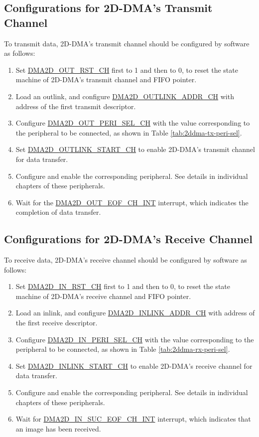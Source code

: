 \documentclass[main\_\_EN.tex]{subfiles}
\begin{document}
\subsection{Configurations for 2D-DMA's Transmit Channel}

To transmit data, 2D-DMA's transmit channel should be configured by software as follows:
\begin{enumerate}
    \item Set \hyperref[fielddesc:DMA2DOUTRSTCHN]{DMA2D\_OUT\_RST\_CH} first to 1 and then to 0, to reset the state machine of 2D-DMA's transmit channel and FIFO pointer.
    \item Load an outlink, and configure \hyperref[fielddesc:DMA2DOUTLINKADDRCHN]{DMA2D\_OUTLINK\_ADDR\_CH} with address of the first transmit descriptor.
    \item Configure \hyperref[fielddesc:DMA2DOUTPERISELCHN]{DMA2D\_OUT\_PERI\_SEL\_CH} with the value corresponding to the peripheral to be connected, as shown in Table \ref{tab:2ddma-tx-peri-sel}.
    \item Set \hyperref[fielddesc:DMA2DOUTLINKSTARTCHN]{DMA2D\_OUTLINK\_START\_CH} to enable 2D-DMA's transmit channel for data transfer.
    \item Configure and enable the corresponding peripheral. See details in individual chapters of these peripherals.
    \item Wait for the \hyperref[int:DMA2DINSUCEOFINT]{DMA2D\_OUT\_EOF\_CH\_INT} interrupt, which indicates the completion of data transfer.
\end{enumerate}

\subsection{Configurations for 2D-DMA's Receive Channel}
To receive data, 2D-DMA's receive channel should be configured by software as follows:
\begin{enumerate}
    \item Set \hyperref[fielddesc:DMA2DINRSTCHN]{DMA2D\_IN\_RST\_CH} first to 1 and then to 0, to reset the state machine of 2D-DMA's receive channel and FIFO pointer.
    \item Load an inlink, and configure \hyperref[fielddesc:DMA2DINLINKADDRCHN]{DMA2D\_INLINK\_ADDR\_CH} with address of the first receive descriptor.
    \item Configure \hyperref[fielddesc:DMA2DINPERISELCHN]{DMA2D\_IN\_PERI\_SEL\_CH} with the value corresponding to the peripheral to be connected, as shown in Table \ref{tab:2ddma-rx-peri-sel}.
    \item Set \hyperref[fielddesc:DMA2DINLINKSTARTCHN]{DMA2D\_INLINK\_START\_CH} to enable 2D-DMA's receive channel for data transfer.
    \item Configure and enable the corresponding peripheral. See details in individual chapters of these peripherals.
    \item Wait for \hyperref[int:DMA2DINSUCEOFINT]{DMA2D\_IN\_SUC\_EOF\_CH\_INT} interrupt, which indicates that an image has been received.
\end{enumerate}
\end{document}
